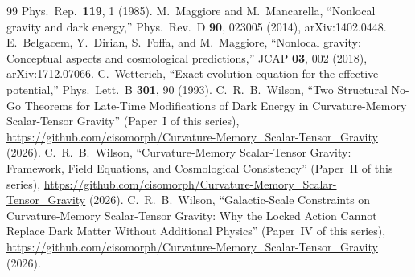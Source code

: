 \documentclass[12pt,a4paper]{article}
\begin{document}
\begin{thebibliography}{99}
  Phys.\ Rep.\ \textbf{119}, 1 (1985).
  M.~Maggiore and M.~Mancarella,
  ``Nonlocal gravity and dark energy,''
  Phys.\ Rev.\ D \textbf{90}, 023005 (2014), arXiv:1402.0448.
  E.~Belgacem, Y.~Dirian, S.~Foffa, and M.~Maggiore,
  ``Nonlocal gravity: Conceptual aspects and cosmological predictions,''
  JCAP \textbf{03}, 002 (2018), arXiv:1712.07066.
  C.~Wetterich,
  ``Exact evolution equation for the effective potential,''
  Phys.\ Lett.\ B \textbf{301}, 90 (1993).
  C.~R.~B.~Wilson,
  ``Two Structural No-Go Theorems for Late-Time Modifications of Dark Energy
    in Curvature-Memory Scalar-Tensor Gravity''
  (Paper~I of this series), \url{https://github.com/cisomorph/Curvature-Memory_Scalar-Tensor_Gravity} (2026).
  C.~R.~B.~Wilson,
  ``Curvature-Memory Scalar-Tensor Gravity: Framework, Field Equations, and Cosmological Consistency''
  (Paper~II of this series), \url{https://github.com/cisomorph/Curvature-Memory_Scalar-Tensor_Gravity} (2026).
  C.~R.~B.~Wilson,
  ``Galactic-Scale Constraints on Curvature-Memory Scalar-Tensor Gravity: Why the Locked Action Cannot Replace Dark Matter Without Additional Physics''
  (Paper~IV of this series), \url{https://github.com/cisomorph/Curvature-Memory_Scalar-Tensor_Gravity} (2026).
\end{thebibliography}
\end{document}
